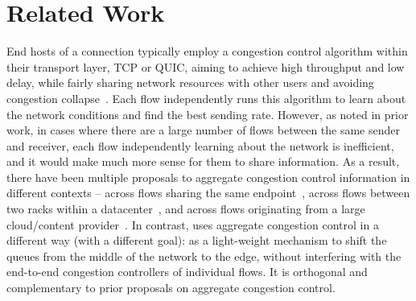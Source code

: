 \section{Related Work}
\label{s:related}


End hosts of a connection typically employ a congestion control algorithm within their transport layer, \eg{} TCP or QUIC, aiming to achieve high throughput and low delay, while fairly sharing network resources with other users and avoiding congestion collapse~\cite{cc-overview?}. 
Each flow independently runs this algorithm to learn about the network conditions and find the best sending rate.
However, as noted in prior work, in cases where there are a large number of flows between the same sender and receiver, each flow independently learning about the network is inefficient, and it would make much more sense for them to share information.
As a result, there have been multiple proposals to aggregate congestion control information in different contexts -- across flows sharing the same endpoint~\cite{cm}, across flows between two racks within a datacenter~\cite{rackcc}, and across flows originating from a large cloud/content provider~\cite{fivecomps}. 
In contrast, \name uses aggregate congestion control in a different way (with a different goal): as a light-weight mechanism to shift the queues from the middle of the network to the edge, without interfering with the end-to-end congestion controllers of individual flows. It is orthogonal and complementary to prior proposals on aggregate congestion control. 


